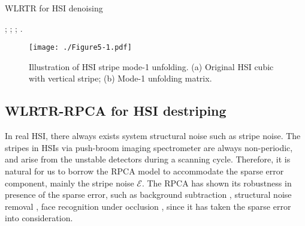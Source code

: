 \documentclass[twocolumn]{svjour3}          %
\begin{document}
\begin{algorithm}[tbp]
\caption{WLRTR for HSI denoising}
     \begin{algorithmic}[1]\label{alg:algo1}
          ;
                   ;
                   ;
                \EndFor
           .
          \EndFor
          \EndProcedure
     \end{algorithmic}
\end{algorithm}

\begin{figure}
    \texttt{[image: ./Figure5-1.pdf]}
   \caption{Illustration of HSI stripe mode-1 unfolding. (a) Original HSI cubic with vertical stripe; (b) Mode-1 unfolding matrix.}
\label{Stripe unfolding}
\end{figure}

  \subsection{WLRTR-RPCA for HSI destriping}

    In real HSI, there always exists system structural noise such as stripe noise. The stripes in HSIs via push-broom imaging spectrometer are always non-periodic, and arise from the unstable detectors during a scanning cycle. Therefore, it is natural for us to borrow the RPCA model \cite{wright2009robust} to accommodate the sparse error component, mainly the stripe noise ${\boldsymbol{\mathcal{E}}}$. The RPCA has shown its robustness in presence of the sparse error, such as background subtraction \cite{gu2016weighted}, structural noise removal \cite{chang2016remote}, face recognition under occlusion \cite{chen2012low}, since it has taken the sparse error into consideration.
\end{document}
